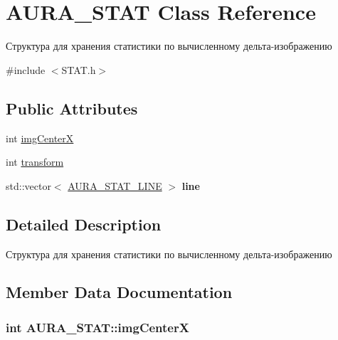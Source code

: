 \hypertarget{class_a_u_r_a___s_t_a_t}{\section{A\+U\+R\+A\+\_\+\+S\+T\+A\+T Class Reference}
\label{class_a_u_r_a___s_t_a_t}
}


Структура для хранения статистики по вычисленному дельта-\/изображению  




{\ttfamily \#include $<$S\+T\+A\+T.\+h$>$}

\subsection*{Public Attributes}
\begin{DoxyCompactItemize}
\item 
int \hyperlink{class_a_u_r_a___s_t_a_t_a02c06367a1ba790c4556666c9a6d0395}{img\+Center\+X}
\item 
int \hyperlink{class_a_u_r_a___s_t_a_t_ad8264a616ff0f5313b67912a3b2f2ce4}{transform}
\item 
\hypertarget{class_a_u_r_a___s_t_a_t_ad95e3143bfee39762a1e64ea5a25000e}{std\+::vector$<$ \hyperlink{class_a_u_r_a___s_t_a_t___l_i_n_e}{A\+U\+R\+A\+\_\+\+S\+T\+A\+T\+\_\+\+L\+I\+N\+E} $>$ {\bfseries line}}\label{class_a_u_r_a___s_t_a_t_ad95e3143bfee39762a1e64ea5a25000e}

\end{DoxyCompactItemize}


\subsection{Detailed Description}
Структура для хранения статистики по вычисленному дельта-\/изображению 



\subsection{Member Data Documentation}
\hypertarget{class_a_u_r_a___s_t_a_t_a02c06367a1ba790c4556666c9a6d0395}{
\subsubsection[{img\+Center\+X}]{\setlength{\rightskip}{0pt plus 5cm}int A\+U\+R\+A\+\_\+\+S\+T\+A\+T\+::img\+Center\+X}}\label{class_a_u_r_a___s_t_a_t_a02c06367a1ba790c4556666c9a6d0395}




